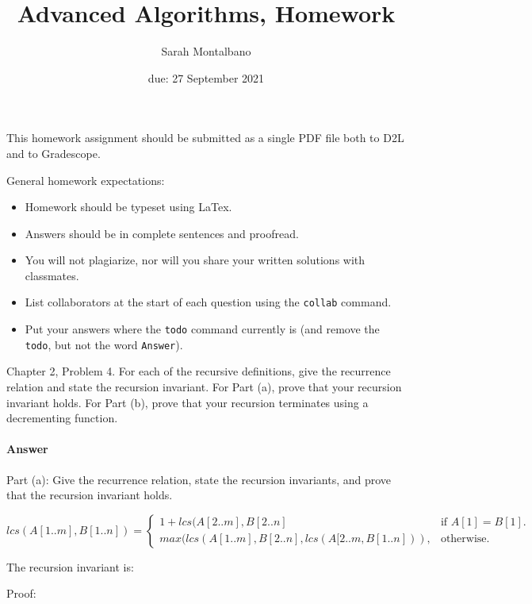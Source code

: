 \documentclass{article}
\title{Advanced Algorithms, Homework \hwnum}
\author{Sarah Montalbano}
\date{due: 27 September 2021}
\begin{document}
\maketitle

This homework assignment should be
submitted as a single PDF file both to D2L and to Gradescope.

General homework expectations:
\begin{itemize}
    \item Homework should be typeset using LaTex.
    \item Answers should be in complete sentences and proofread.
    \item You will not plagiarize, nor will you share your written solutions
        with classmates.
    \item List collaborators at the start of each question using the
        \texttt{collab} command.
    \item Put your answers where the \texttt{todo} command currently is (and
        remove the \texttt{todo}, but not the word \texttt{Answer}).
\end{itemize}




Chapter 2, Problem 4. For each of the recursive definitions, give the recurrence
relation and state the recursion invariant. For Part (a), prove that your
recursion invariant holds.  For Part (b), prove that your recursion terminates
using a decrementing function.

\paragraph{Answer}{Part (a): Give the recurrence relation, state the recursion invariants, and prove that the recursion invariant holds.

\begin{equation}
lcs(A[1..m], B[1..n]) = 
\begin{cases}
    1 + lcs(A[2..m], B[2..n] & \text{if $A[1] = B[1]$}.\\
    max(lcs(A[1..m], B[2..n], lcs(A[2..m, B[1..n])), & \text{otherwise}.
  \end{cases}
\end{equation}}

The recursion invariant is: \todo{}

Proof: \todo{}
\end{document}
